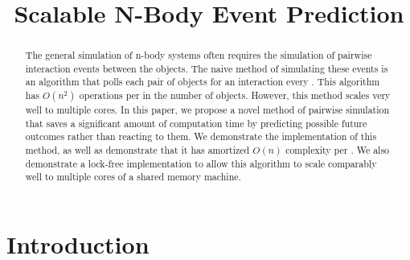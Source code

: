 \documentclass[conference]{IEEEtran}
\begin{document}
%
\title{Scalable N-Body Event Prediction}


\author{
\and{}
}

\maketitle


\begin{abstract} %
The general simulation of n-body systems often requires the simulation of pairwise interaction events between the objects.  The naive method of simulating these events is an algorithm that polls each pair of objects for an interaction every .  This algorithm has $O(n^2)$ operations per  in the number of objects.  However, this method scales very well to multiple cores. In this paper, we propose a novel method of pairwise simulation that saves a significant amount of computation time by predicting possible future outcomes rather than reacting to them.  We demonstrate the implementation of this method, as well as demonstrate that it has amortized $O(n)$ complexity per .  We also demonstrate a lock-free implementation to allow this algorithm to scale comparably well to multiple cores of a shared memory machine.
\end{abstract}

\IEEEpeerreviewmaketitle


\section{Introduction}
\end{document}
